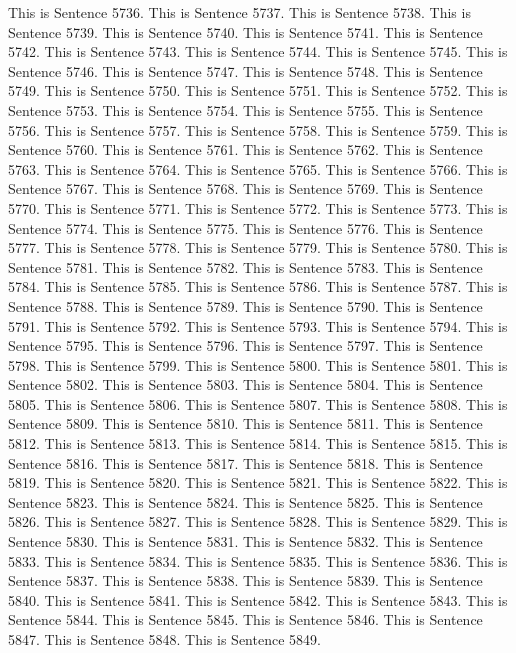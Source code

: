 \documentclass{article}
\begin{document}
This is Sentence 5736.
This is Sentence 5737.
This is Sentence 5738.
This is Sentence 5739.
This is Sentence 5740.
This is Sentence 5741.
This is Sentence 5742.
This is Sentence 5743.
This is Sentence 5744.
This is Sentence 5745.
This is Sentence 5746.
This is Sentence 5747.
This is Sentence 5748.
This is Sentence 5749.
This is Sentence 5750.
This is Sentence 5751.
This is Sentence 5752.
This is Sentence 5753.
This is Sentence 5754.
This is Sentence 5755.
This is Sentence 5756.
This is Sentence 5757.
This is Sentence 5758.
This is Sentence 5759.
This is Sentence 5760.
This is Sentence 5761.
This is Sentence 5762.
This is Sentence 5763.
This is Sentence 5764.
This is Sentence 5765.
This is Sentence 5766.
This is Sentence 5767.
This is Sentence 5768.
This is Sentence 5769.
This is Sentence 5770.
This is Sentence 5771.
This is Sentence 5772.
This is Sentence 5773.
This is Sentence 5774.
This is Sentence 5775.
This is Sentence 5776.
This is Sentence 5777.
This is Sentence 5778.
This is Sentence 5779.
This is Sentence 5780.
This is Sentence 5781.
This is Sentence 5782.
This is Sentence 5783.
This is Sentence 5784.
This is Sentence 5785.
This is Sentence 5786.
This is Sentence 5787.
This is Sentence 5788.
This is Sentence 5789.
This is Sentence 5790.
This is Sentence 5791.
This is Sentence 5792.
This is Sentence 5793.
This is Sentence 5794.
This is Sentence 5795.
This is Sentence 5796.
This is Sentence 5797.
This is Sentence 5798.
This is Sentence 5799.
This is Sentence 5800.
This is Sentence 5801.
This is Sentence 5802.
This is Sentence 5803.
This is Sentence 5804.
This is Sentence 5805.
This is Sentence 5806.
This is Sentence 5807.
This is Sentence 5808.
This is Sentence 5809.
This is Sentence 5810.
This is Sentence 5811.
This is Sentence 5812.
This is Sentence 5813.
This is Sentence 5814.
This is Sentence 5815.
This is Sentence 5816.
This is Sentence 5817.
This is Sentence 5818.
This is Sentence 5819.
This is Sentence 5820.
This is Sentence 5821.
This is Sentence 5822.
This is Sentence 5823.
This is Sentence 5824.
This is Sentence 5825.
This is Sentence 5826.
This is Sentence 5827.
This is Sentence 5828.
This is Sentence 5829.
This is Sentence 5830.
This is Sentence 5831.
This is Sentence 5832.
This is Sentence 5833.
This is Sentence 5834.
This is Sentence 5835.
This is Sentence 5836.
This is Sentence 5837.
This is Sentence 5838.
This is Sentence 5839.
This is Sentence 5840.
This is Sentence 5841.
This is Sentence 5842.
This is Sentence 5843.
This is Sentence 5844.
This is Sentence 5845.
This is Sentence 5846.
This is Sentence 5847.
This is Sentence 5848.
This is Sentence 5849.
\end{document}

